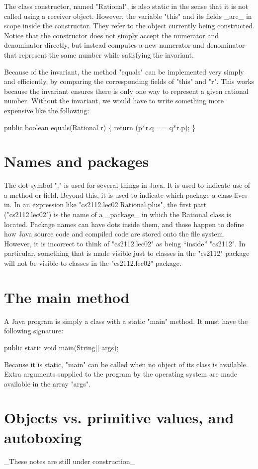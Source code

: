 \documentclass{article}
\begin{document}
The class constructor, named "Rational", is also static in the sense
that it is not called using a receiver object. However, the variable
"this" and its fields _are_ in scope inside the constructor. They
refer to the object currently being constructed. Notice that the
constructor does not simply accept the numerator and denominator
directly, but instead computes a new numerator and denominator that
represent the same number while satisfying the invariant.

Because of the invariant, the method "equals" can be implemented very
simply and efficiently, by comparing the corresponding fields of
"this" and "r". This works because the invariant ensures there is only
one way to represent a given rational number. Without the invariant,
we would have to write something more expensive like the following:

\begin{code}
  public boolean equals(Rational r) \{
    return (p*r.q == q*r.p);
  \}
\end{code}

\section{Names and packages}

The dot symbol "." is used for several things in Java. It is used to
indicate use of a method or field. Beyond this, it is used to indicate
which package a class lives in. In an expression like
"cs2112.lec02.Rational.plus", the first part ("cs2112.lec02") is the
name of a _package_ in which the Rational class is located. Package
names can have dots inside them, and those happen to define how Java
source code and compiled code are stored onto the file system.
However, it is incorrect to think of "cs2112.lec02" as being
``inside'' "cs2112". In particular, something that is made visible
just to classes in the "cs2112" package will not be visible to classes
in the "cs2112.lec02" package.

\section{The main method}

A Java program is simply a class with a static "main" method. It must
have the following signature:

\begin{code}
public static void main(String[] args);
\end{code}

Because it is static, "main" can be called when no object of its class is
available. Extra arguments supplied to the program by the operating
system are made available in the array "args".

\section{Objects vs. primitive values, and autoboxing}

_These notes are still under construction_
\end{document}
